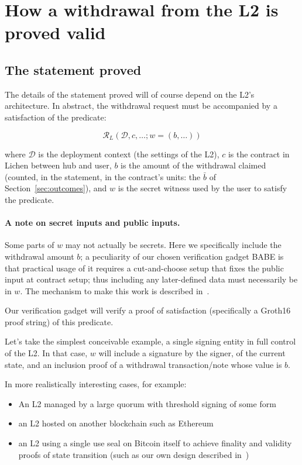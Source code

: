 \documentclass[11pt]{article}
\begin{document}
\section{How a withdrawal from the L2 is proved valid}
\label{sec:statement}

\subsection{The statement proved}

The details of the statement proved will of course depend on the L2's architecture. In abstract, the withdrawal request must be accompanied by a satisfaction of the predicate:

\[\mathcal{R}_L(\mathcal{D}, c, \ldots ; w=(b, \ldots))\]

where $\mathcal{D}$ is the deployment context (the settings of the L2), $c$ is the contract in Lichen between hub and user, $b$ is the amount of the withdrawal claimed (counted, in the statement, in the contract's units: the $\bar b$ of Section~\ref{sec:outcomes}), and $w$ is the secret witness used by the user to satisfy the predicate.

\paragraph{A note on secret inputs and public inputs.} Some parts of $w$ may not actually be secrets. Here we specifically include the withdrawal amount $b$; a peculiarity of our chosen verification gadget BABE is that practical usage of it requires a cut-and-choose setup that fixes the public input at contract setup; thus including any later-defined data must necessarily be in $w$. The mechanism to make this work is described in~\cite[\S 5]{lichenbuilt}.


Our verification gadget will verify a proof of satisfaction (specifically a Groth16 proof string) of this predicate.

 Let's take the simplest conceivable example, a single signing entity in full control of the L2. In that case, $w$ will include a signature by the signer, of the current state, and an inclusion proof of a withdrawal transaction/note whose value is $b$.
 
In more realistically interesting cases, for example:

\begin{itemize}
\item An L2 managed by a large quorum with threshold signing of some form
\item an L2 hosted on another blockchain such as Ethereum
\item an L2 using a single use seal on Bitcoin itself to achieve finality and validity proofs of state transition (such as our own design described in~\cite{lichenbuilt})
\end{itemize}
\end{document}
